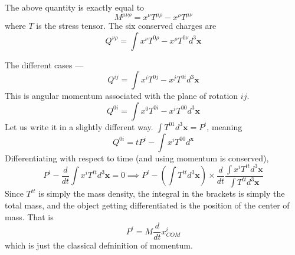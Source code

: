 \documentclass[11pt]{article}
\numberwithin{equation}{section}
\begin{document}
    The above quantity is exactly equal to 
    \begin{equation*}
        M^{\mu\nu\rho} = x^\nu T^{\mu\rho} - x^\rho T^{\mu\nu}
    \end{equation*}
    where \(T\) is the stress tensor. The six conserved charges are 
    \begin{equation*}
        Q^{\nu\rho} = \int  x^\nu T^{0\rho} - x^\rho T^{0\nu} d^3\textbf{x}
    \end{equation*}

    The different cases —\\
    \begin{equation*}
        Q^{ij} = \int  x^i T^{0j} - x^j T^{0i} d^3\textbf{x}
    \end{equation*}
    This is angular momentum associated with the plane of rotation \(ij\).
    \begin{equation*}
        Q^{0i} = \int  x^0 T^{0i} - x^i T^{00} d^3\textbf{x}
    \end{equation*}
    Let us write it in a slightly different way. \(\int T^{01} d^3\textbf{x} = P^i\), meaning 
    \begin{equation*}
        Q^{0i} = tP^i - \int x^i T^{00} d^\textbf{x}
    \end{equation*}
    Differentiating with respect to time (and using momentum is conserved),
    \begin{equation*}
        P^i - \frac{d}{dt} \int x^i T^{tt} d^3\textbf{x} = 0 \implies P^i - \left(\int  T^{tt}d^3\textbf{x} \right)\times \frac{d}{dt} \frac{\int x^i T^{tt} d^3\textbf{x}}{\int  T^{tt} d^3\textbf{x}}
    \end{equation*}
    Since \(T^{tt}\) is simply the mass density, the integral in the brackets is simply the total mass, and the object getting differentiated is the position of the center of mass. That is 
    \begin{equation*}
        P^i = M\frac{d}{dt} x^i_{COM}
    \end{equation*}
    which is just the classical defninition of momentum. 
\end{document}
